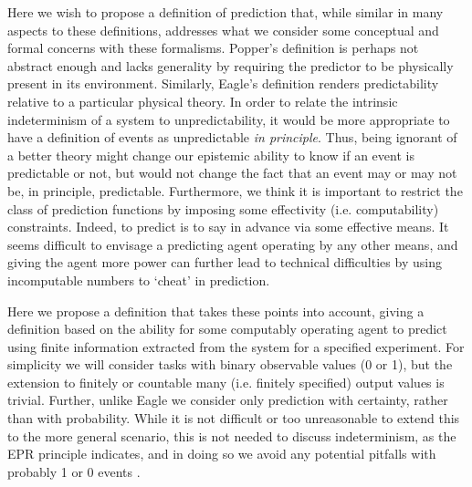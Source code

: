 \documentclass[%
 superscriptaddress,
 preprint,
 showpacs,
 showkeys,
 preprintnumbers,
  amsmath,amssymb,
  aps,
 pra,
  longbibliography,
  floatfix,
 ]{revtex4-1}
\theoremstyle{definition}
\begin{document}
Here we wish to propose a definition of prediction that, while similar in many aspects to these definitions, addresses what we consider some conceptual and formal concerns with these formalisms.
Popper's definition is perhaps not abstract enough and lacks generality by requiring the predictor to be physically present in its environment.
Similarly, Eagle's definition renders predictability relative to a particular physical theory.
In order to relate the intrinsic indeterminism of a system to unpredictability, it would be more appropriate to have a definition of events as unpredictable \emph{in principle}.
Thus, being ignorant of a better theory might change our epistemic ability to know if an event is predictable or not, but would not change the fact that an event may or may not be, in principle, predictable.
Furthermore, we think it is important to restrict the class of prediction functions by imposing some effectivity (i.e. computability) constraints.
Indeed, to predict is to say in advance via some effective means.
It seems difficult to envisage a predicting agent operating by any other means, and giving the agent more power can further lead to technical difficulties by using incomputable numbers to `cheat' in prediction. %

Here we propose a definition that takes these points into account, giving a definition based on the ability for some computably operating agent to predict using finite information extracted from the system for a specified experiment.
For simplicity we will consider tasks with binary observable values (0 or 1), but the extension to finitely or countable many (i.e. finitely specified) output values is trivial.
Further, unlike Eagle \cite{Eagle:2005ys} we consider only prediction with certainty, rather than with probability.%
While it is not difficult or too unreasonable to extend this to the more general scenario, this is not needed to discuss indeterminism, as the EPR principle indicates, and in doing so we avoid any potential pitfalls with probably 1 or 0 events \cite{Zaman:1987gd}.






\end{document}
